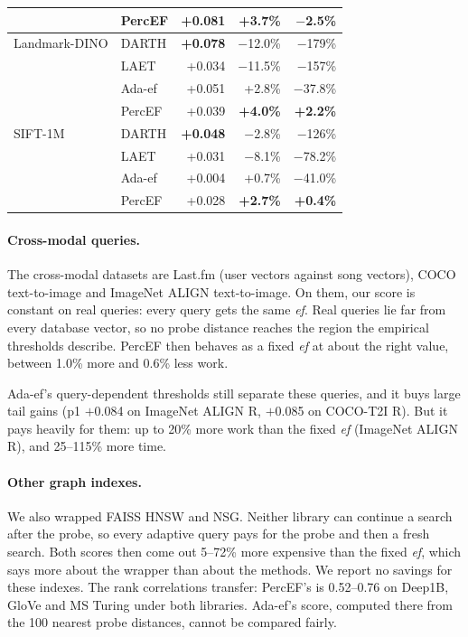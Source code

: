 \documentclass[sigconf, nonacm]{acmart}
\newcommand{\ef}{\textit{ef}}
\begin{document}
\begin{table}[t]
\begin{tabular}{llrrr}
                  & PercEF & +0.081 & +3.7\% & \textbf{$-$2.5\%} \\
    \midrule
    Landmark-DINO & DARTH  & \textbf{+0.078} & $-$12.0\% & $-$179\% \\
                  & LAET   & +0.034 & $-$11.5\% & $-$157\% \\
                  & Ada-ef & +0.051 & +2.8\% & $-$37.8\% \\
                  & PercEF & +0.039 & \textbf{+4.0\%} & \textbf{+2.2\%} \\
    \midrule
    SIFT-1M       & DARTH  & \textbf{+0.048} & $-$2.8\% & $-$126\% \\
                  & LAET   & +0.031 & $-$8.1\% & $-$78.2\% \\
                  & Ada-ef & +0.004 & +0.7\% & $-$41.0\% \\
                  & PercEF & +0.028 & \textbf{+2.7\%} & \textbf{+0.4\%} \\
    \bottomrule
  \end{tabular}
\end{table}

\paragraph{Cross-modal queries.}
The cross-modal datasets are Last.fm (user vectors against song vectors), COCO text-to-image and
ImageNet ALIGN text-to-image. On them, our score is constant on real queries: every query gets the
same \ef{}. Real queries lie far from every database vector, so no probe distance reaches the region
the empirical thresholds describe. PercEF then behaves as a fixed \ef{} at about the right value,
between 1.0\% more and 0.6\% less work.

Ada-ef's query-dependent thresholds still separate these queries, and it buys large tail gains (p1
$+$0.084 on ImageNet ALIGN R, $+$0.085 on COCO-T2I R). But it pays heavily for them: up to 20\% more
work than the fixed \ef{} (ImageNet ALIGN R), and 25--115\% more time.

\paragraph{Other graph indexes.}
We also wrapped FAISS HNSW and NSG. Neither library can continue a search after the probe, so every
adaptive query pays for the probe and then a fresh search. Both scores then come out 5--72\% more
expensive than the fixed \ef{}, which says more about the wrapper than about the methods. We report
no savings for these indexes. The rank correlations transfer: PercEF's is 0.52--0.76 on Deep1B, GloVe
and MS Turing under both libraries. Ada-ef's score, computed there from the 100 nearest probe
distances, cannot be compared fairly.
\end{document}
